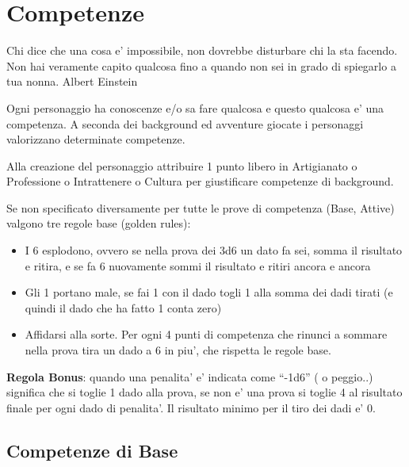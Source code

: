 \documentclass[a4paper,11pt,twoside,openany]{dndbook}
\begin{document}
\pagebreak

\section{Competenze}

\label{competenze}
\begin{quotebox}
Chi dice che una cosa e' impossibile, non dovrebbe disturbare chi la sta facendo.\linebreak
Non hai veramente capito qualcosa fino a quando non sei in grado di spiegarlo a tua nonna. Albert Einstein\end{quotebox}


Ogni personaggio ha conoscenze e/o sa fare qualcosa e questo qualcosa e' una competenza. A seconda dei background ed avventure giocate i personaggi valorizzano determinate competenze.

Alla creazione del personaggio attribuire 1 punto libero in Artigianato o Professione o Intrattenere o Cultura per giustificare competenze di background.

Se non specificato diversamente per tutte le prove di competenza (Base, Attive) valgono tre regole base (golden rules):

\begin{itemize}
\item 
I 6 esplodono, ovvero se nella prova dei 3d6 un dato fa sei, somma
il risultato e ritira, e se fa 6 nuovamente sommi il risultato e ritiri
ancora e ancora 
\item 
Gli 1 portano male, se fai 1 con il dado togli 1 alla somma dei dadi
tirati (e quindi il dado che ha fatto 1 conta zero) 
\item 
Affidarsi alla sorte. Per ogni 4 punti di competenza che rinunci a
sommare nella prova tira un dado a 6 in piu', che rispetta le regole
base. 
\end{itemize}

\textbf{Regola Bonus}: quando una penalita' e' indicata come ``-1d6'' ( o peggio..) significa che si toglie 1 dado alla prova, se non e' una prova si toglie 4 al risultato finale per ogni dado di penalita'. Il risultato minimo per il tiro dei dadi e' 0.


\subsection{Competenze di Base}

\label{competenze-di-base}
\end{document}

